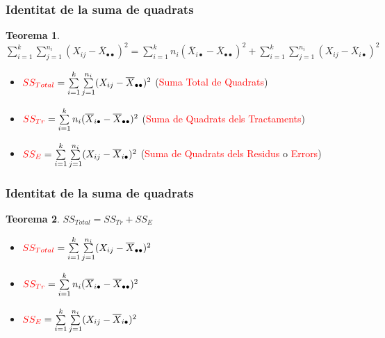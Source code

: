 \documentclass[12pt,t]{beamer}
\newcommand{\red}[1]{\textcolor{red}{#1}}
\theoremstyle{plain}
\newtheorem{teorema}{Teorema}
\theoremstyle{definition}
\begin{document}
\begin{frame}
\frametitle{Identitat de la suma de quadrats}
\begin{teorema}
{\small 
$\displaystyle \sum_{i=1}^k\sum_{j=1}^{n_i} (X_{ij}-\overline{X}_{\bullet\bullet})^2 =
\sum_{i=1}^k n_i (\overline{X}_{i\bullet}-\overline{X}_{\bullet\bullet})^2 +
\sum_{i=1}^k\sum_{j=1}^{n_i} (X_{ij}-\overline{X}_{i\bullet})^2$
}
\end{teorema}
\begin{itemize}
\item $\red{SS_{Total}}=\sum\limits_{i=1}^k\sum\limits_{j=1}^{n_i} (X_{ij}-\overline{X}_{\bullet\bullet})^2$   (\red{Suma Total de Quadrats})

\item $\red{SS_{Tr}}=\sum\limits_{i=1}^k n_i
(\overline{X}_{i\bullet}-\overline{X}_{\bullet\bullet})^2$ (\red{Suma de Quadrats dels Tractaments}) 

\item $\red{SS_E}=\sum\limits_{i=1}^k\sum\limits_{j=1}^{n_i} (X_{ij}-\overline{X}_{i\bullet})^2$
(\red{Suma de Quadrats dels Residus} o \red{Errors})
\end{itemize}
\end{frame}

\begin{frame}
\frametitle{Identitat de la suma de quadrats}
\begin{teorema}
$SS_{Total}=SS_{Tr}+SS_E$
\end{teorema}
\begin{itemize}
\item $\red{SS_{Total}}=\sum\limits_{i=1}^k\sum\limits_{j=1}^{n_i} (X_{ij}-\overline{X}_{\bullet\bullet})^2$   

\item $\red{SS_{Tr}}=\sum\limits_{i=1}^k n_i
(\overline{X}_{i\bullet}-\overline{X}_{\bullet\bullet})^2$  

\item $\red{SS_E}=\sum\limits_{i=1}^k\sum\limits_{j=1}^{n_i} (X_{ij}-\overline{X}_{i\bullet})^2$
\end{itemize}
\end{frame}
\end{document}
